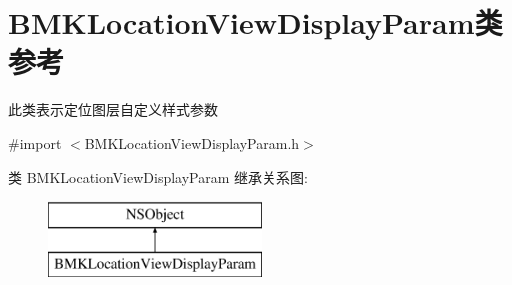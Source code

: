 \hypertarget{interface_b_m_k_location_view_display_param}{}\section{B\+M\+K\+Location\+View\+Display\+Param类 参考}
\label{interface_b_m_k_location_view_display_param}


此类表示定位图层自定义样式参数  




{\ttfamily \#import $<$B\+M\+K\+Location\+View\+Display\+Param.\+h$>$}

类 B\+M\+K\+Location\+View\+Display\+Param 继承关系图\+:\begin{figure}[H]
\begin{center}
\leavevmode
\includegraphics[height=2.000000cm]{interface_b_m_k_location_view_display_param}
\end{center}
\end{figure}
